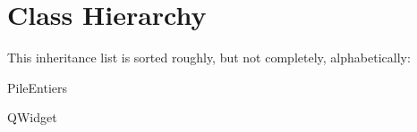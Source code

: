\section{Class Hierarchy}
This inheritance list is sorted roughly, but not completely, alphabetically\+:\begin{DoxyCompactList}
\item Pile\+Entiers\begin{DoxyCompactList}
\item {}
\end{DoxyCompactList}
\item Q\+Widget\begin{DoxyCompactList}
\item {}
\end{DoxyCompactList}
\end{DoxyCompactList}
